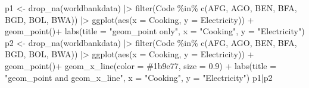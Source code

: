 \documentclass[
  letterpaper,
  DIV=11,
  numbers=noendperiod]{scrreprt}
\newenvironment{Shaded}{\begin{snugshade}}{\end{snugshade}}
\newcommand{\AttributeTok}[1]{\textcolor[rgb]{0.40,0.45,0.13}{#1}}
\newcommand{\FloatTok}[1]{\textcolor[rgb]{0.68,0.00,0.00}{#1}}
\newcommand{\FunctionTok}[1]{\textcolor[rgb]{0.28,0.35,0.67}{#1}}
\newcommand{\NormalTok}[1]{\textcolor[rgb]{0.00,0.23,0.31}{#1}}
\newcommand{\OtherTok}[1]{\textcolor[rgb]{0.00,0.23,0.31}{#1}}
\newcommand{\SpecialCharTok}[1]{\textcolor[rgb]{0.37,0.37,0.37}{#1}}
\newcommand{\StringTok}[1]{\textcolor[rgb]{0.13,0.47,0.30}{#1}}
\begin{document}
\begin{Shaded}
\begin{Highlighting}[]
\NormalTok{p1 }\OtherTok{\textless{}{-}} \FunctionTok{drop\_na}\NormalTok{(worldbankdata) }\SpecialCharTok{|\textgreater{}} 
  \FunctionTok{filter}\NormalTok{(Code }\SpecialCharTok{\%in\%} \FunctionTok{c}\NormalTok{(}\StringTok{\textquotesingle{}AFG\textquotesingle{}}\NormalTok{, }\StringTok{\textquotesingle{}AGO\textquotesingle{}}\NormalTok{, }\StringTok{\textquotesingle{}BEN\textquotesingle{}}\NormalTok{, }\StringTok{\textquotesingle{}BFA\textquotesingle{}}\NormalTok{, }\StringTok{\textquotesingle{}BGD\textquotesingle{}}\NormalTok{, }\StringTok{\textquotesingle{}BOL\textquotesingle{}}\NormalTok{, }\StringTok{\textquotesingle{}BWA\textquotesingle{}}\NormalTok{)) }\SpecialCharTok{|\textgreater{}}
  \FunctionTok{ggplot}\NormalTok{(}\FunctionTok{aes}\NormalTok{(}\AttributeTok{x =}\NormalTok{ Cooking, }\AttributeTok{y =}\NormalTok{ Electricity)) }\SpecialCharTok{+} \FunctionTok{geom\_point}\NormalTok{()}\SpecialCharTok{+}
  \FunctionTok{labs}\NormalTok{(}\AttributeTok{title =} \StringTok{"geom\_point only"}\NormalTok{, }\AttributeTok{x =} \StringTok{"Cooking"}\NormalTok{, }\AttributeTok{y =} \StringTok{"Electricity"}\NormalTok{) }
\NormalTok{p2 }\OtherTok{\textless{}{-}} \FunctionTok{drop\_na}\NormalTok{(worldbankdata) }\SpecialCharTok{|\textgreater{}} 
  \FunctionTok{filter}\NormalTok{(Code }\SpecialCharTok{\%in\%} \FunctionTok{c}\NormalTok{(}\StringTok{\textquotesingle{}AFG\textquotesingle{}}\NormalTok{, }\StringTok{\textquotesingle{}AGO\textquotesingle{}}\NormalTok{, }\StringTok{\textquotesingle{}BEN\textquotesingle{}}\NormalTok{, }\StringTok{\textquotesingle{}BFA\textquotesingle{}}\NormalTok{, }\StringTok{\textquotesingle{}BGD\textquotesingle{}}\NormalTok{, }\StringTok{\textquotesingle{}BOL\textquotesingle{}}\NormalTok{, }\StringTok{\textquotesingle{}BWA\textquotesingle{}}\NormalTok{)) }\SpecialCharTok{|\textgreater{}}
  \FunctionTok{ggplot}\NormalTok{(}\FunctionTok{aes}\NormalTok{(}\AttributeTok{x =}\NormalTok{ Cooking, }\AttributeTok{y =}\NormalTok{ Electricity)) }\SpecialCharTok{+} \FunctionTok{geom\_point}\NormalTok{()}\SpecialCharTok{+}
  \FunctionTok{geom\_x\_line}\NormalTok{(}\AttributeTok{color =} \StringTok{\textquotesingle{}\#1b9e77\textquotesingle{}}\NormalTok{, }\AttributeTok{size =} \FloatTok{0.9}\NormalTok{) }\SpecialCharTok{+}
  \FunctionTok{labs}\NormalTok{(}\AttributeTok{title =} \StringTok{"geom\_point and geom\_x\_line"}\NormalTok{, }\AttributeTok{x =} \StringTok{"Cooking"}\NormalTok{, }\AttributeTok{y =} \StringTok{"Electricity"}\NormalTok{) }
\NormalTok{p1}\SpecialCharTok{|}\NormalTok{p2}
\end{Highlighting}
\end{Shaded}
\end{document}
